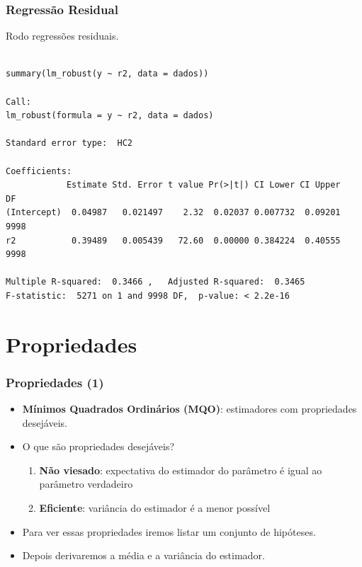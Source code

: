 \documentclass[10pt,slides,xcolor=pdftex,dvipsnames,table]{beamer}
\begin{document}
\begin{frame}[fragile]
	\frametitle{Regressão Residual}

\vspace{0.5cm}
Rodo regressões residuais.

\begin{lstlisting}

summary(lm_robust(y ~ r2, data = dados))

Call:
lm_robust(formula = y ~ r2, data = dados)

Standard error type:  HC2 

Coefficients:
            Estimate Std. Error t value Pr(>|t|) CI Lower CI Upper   DF
(Intercept)  0.04987   0.021497    2.32  0.02037 0.007732  0.09201 9998
r2           0.39489   0.005439   72.60  0.00000 0.384224  0.40555 9998

Multiple R-squared:  0.3466 ,	Adjusted R-squared:  0.3465 
F-statistic:  5271 on 1 and 9998 DF,  p-value: < 2.2e-16

\end{lstlisting}

\end{frame}


\section{Propriedades}


\begin{frame}[fragile]
	\frametitle{Propriedades (1)}

\begin{itemize}\itemsep1.2em

\item \textbf{Mínimos Quadrados Ordinários (MQO)}: estimadores com propriedades desejáveis.

\item O que são propriedades desejáveis?
\begin{enumerate}
\item \textbf{Não viesado}: expectativa do estimador do parâmetro é igual ao parâmetro verdadeiro
\item \textbf{Eficiente}: variância do estimador é a menor possível     
\end{enumerate}        

\item Para ver essas propriedades iremos listar um conjunto de hipóteses.

\item Depois derivaremos a média e a variância do estimador. 

\end{itemize}

\end{frame}
\end{document}

